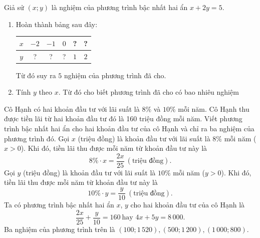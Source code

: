 \begin{vd}
	Giả sử $(x;y)$ là nghiệm của phương trình bậc nhất hai ẩn $x+2y=5$.
	\begin{enumerate}
	\item Hoàn thành bảng sau đây:
	\begin{center}
	\begin{tabular}{|c|c|c|c|c|c|}
	\hline
	$x$&$-2$& $-1$&$0$&?&?\\
	\hline
	$y$&?&?&?&$1$&$2$\\
	\hline
	\end{tabular}
	\end{center}
	Từ đó suy ra $5$ nghiệm của phương trình đã cho.
	\item Tính $y$ theo $x$. Từ đó cho biết phương trình đã cho có bao nhiêu nghiệm
	\end{enumerate}
\end{vd}
\begin{vd}
	Cô Hạnh có hai khoản đầu tư với lãi suất là $8\%$ và $10\%$ mỗi năm. Cô Hạnh thu được tiền lãi từ hai khoản đầu tư đó là 160 triệu đồng mỗi năm. Viết phương trình bậc nhất hai ẩn cho hai khoản đầu tư của cô Hạnh và chỉ ra ba nghiệm của phương trình đó.
	\loigiai
	{ Gọi $x$ (triệu đồng) là khoản đầu tư với lãi suất là $8\%$ mỗi năm ($x>0$). Khi đó, tiền lãi thu được mỗi năm từ khoản đầu tư này là \[8\%\cdot x=\dfrac{2x}{25}\ (\mbox{triệu đồng}).\]
	Gọi $y$ (triệu đồng) là khoản đầu tư với lãi suất là $10\%$ mỗi năm ($y>0$). Khi đó, tiền lãi thu được mỗi năm từ khoản đầu tư này là \[10\%\cdot y=\dfrac{y}{10}\ (\mbox{triệu đồng}).\]
	Ta có phương trình bậc nhất hai ẩn $x$, $y$ cho hai khoản đầu tư của cô Hạnh là 
	\[\dfrac{2x}{25}+\dfrac{y}{10}=160\ \mbox{hay }4x+5y=8\, 000.\]
	Ba nghiệm của phương trình trên là $(100; 1\, 520), (500;1\,200),(1\, 000;800)$.
	}
\end{vd}
